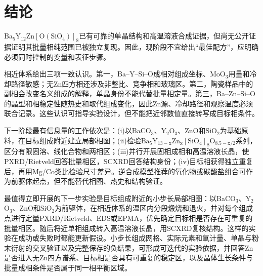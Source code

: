 \section{结论}
\label{sec:transferability}

$\mathrm{Ba_5Y_{12}Zn[O(SiO_4)]_8}$已有可靠的单晶结构和高温溶液合成证据，但尚无公开证据证明其批量相纯范围已被独立复现\cite{ababaikeri2024ba5y12zn}。因此，现阶段不宜给出“最佳配方”，应明确必须同时控制的变量和表征步骤。

相近体系给出三项一致认识。第一，Ba--Y--Si--O成相对组成坐标、MoO$_3$用量和冷却路径敏感；无Zn四方相还涉及非整比、竞争相和玻璃区\cite{wierzbickawieczorek2017high,yamane2024synthesis,gulay2024navigation}。第二，陶瓷样品中的副相会改变名义组成的解释，单晶身份不能代替批量相定量\cite{yamane2024microstructure}。第三，Ba--Zn--Si--O的晶型和相稳定性随热史和取代组成变化，因此Zn源、冷却路径和观察温度必须联合记录\cite{lin1999phase,kerstan2013bazn2si2o7,zou2019anti}。这些认识可指导实验设计，但不能把近邻数值直接转写成目标相条件。

下一阶段最有信息量的工作依次是：(i)以BaCO$_3$、Y$_2$O$_3$、ZnO和SiO$_2$为基础原料，在目标组成附近建立局部相图；(ii)检验$\mathrm{Ba_5Y_{13-x}Zn_x[SiO_4]_8O_{8.5-x/2}}$系列，区分有限固溶、线化合物和两相区；(iii)并行开展固相成相和高温溶液长晶，使PXRD/Rietveld回答批量相区，SCXRD回答结构身份；(iv)目标相获得独立重复后，再用Mg/Co类比检验尺寸差异。逆合成模型推荐的氧化物或碳酸盐组合可作为前驱体起点，但不能替代相图、热史和结构验证。

最值得立即开展的下一步实验是目标组成附近的小步长局部相图：以BaCO$_3$、Y$_2$O$_3$、ZnO和SiO$_2$为前驱体，在相近体系的温区内分段煅烧和退火，并对每个组成点进行定量PXRD/Rietveld、EDS或EPMA，优先确定目标相是否存在可重复的批量相区。随后将近单相组成转入高温溶液长晶，用SCXRD复核结构。这样的实验在成功或失败时都能更新假设。小步长组成网格、实际元素和氧计量、单晶与粉末衍射的交叉验证以及完整保存的负结果，可形成可迭代的实验依据，并回答Zn是否进入无Zn四方谱系、目标相是否具有可重复的稳定区，以及晶体生长条件与批量成相条件是否属于同一相平衡区域。
